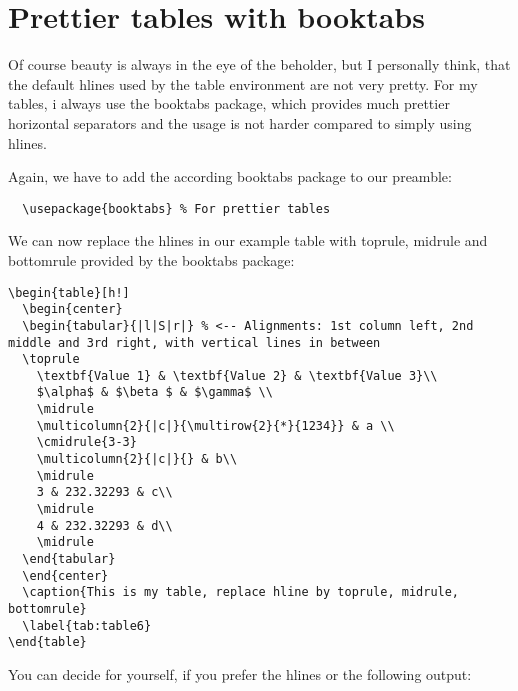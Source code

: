 \documentclass[%
  parskip=full,%
  twoside=false%
]{book}
\begin{document}
\section{Prettier tables with booktabs}

Of course beauty is always in the eye of the beholder, but I personally think, that the default hlines used by the table environment are not very pretty. For my tables, i always use the booktabs package, which provides much prettier horizontal separators and the usage is not harder compared to simply using hlines.

Again, we have to add the according booktabs package to our preamble:

\begin{lstlisting}
  \usepackage{booktabs} % For prettier tables
\end{lstlisting}

We can now replace the hlines in our example table with toprule, midrule and bottomrule provided by the booktabs package:

\begin{lstlisting}
\begin{table}[h!]
  \begin{center}
  \begin{tabular}{|l|S|r|} % <-- Alignments: 1st column left, 2nd middle and 3rd right, with vertical lines in between
  \toprule
    \textbf{Value 1} & \textbf{Value 2} & \textbf{Value 3}\\
    $\alpha$ & $\beta $ & $\gamma$ \\
    \midrule
    \multicolumn{2}{|c|}{\multirow{2}{*}{1234}} & a \\
    \cmidrule{3-3}
    \multicolumn{2}{|c|}{} & b\\
    \midrule
    3 & 232.32293 & c\\
    \midrule
    4 & 232.32293 & d\\
    \midrule
  \end{tabular}
  \end{center}
  \caption{This is my table, replace hline by toprule, midrule, bottomrule}
  \label{tab:table6}
\end{table}
\end{lstlisting}

You can decide for yourself, if you prefer the hlines or the following output:
\end{document}
